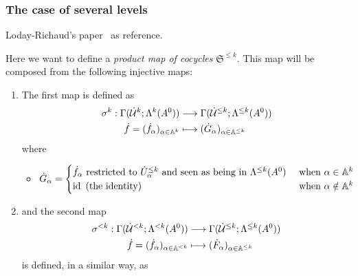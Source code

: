 \subsubsection{The case of several levels}
Loday-Richaud's paper~\cite{Loday1994} as reference.
\begin{defn}\label{defn:firstSetOfInlusions}
  Here we want to define a \emph{product map of cocycles}
  $\mathfrak{S}^{\leq k}$.
  This map will be composed from the following injective maps:
  \begin{enumerate}
    \item The first map is defined as
      \begin{align*}
        \sigma^k:\Gamma(\dot{\mathcal{U}}^k;\Lambda^k(A^0))
        &\longrightarrow \Gamma(\dot{\mathcal{U}}^{\leq k};\Lambda^{\leq k}(A^0))
      \\\dot f=(\dot f_\alpha)_{\alpha\in\mathbb{A}^k}
        &\longmapsto (\dot G_\alpha)_{\alpha\in\mathbb{A}^{\leq k}}
      \end{align*}
      where
      \begin{itemize}
        \item $\dot G_\alpha=\begin{cases}
            \dot f_\alpha \text{~restricted to } \dot U_\alpha^{\leq k}
            \text{~and seen as being in } \Lambda^{\leq k}(A^0)
            & \text{~when } \alpha\in\mathbb{A}^k
          \\\operatorname{id} \text{~(the identity) }
            & \text{~when } \alpha\notin\mathbb{A}^k
          \end{cases}$
      \end{itemize}
    \item and the second map
      \begin{align*}
        \sigma^{<k}:\Gamma(\dot{\mathcal{U}}^{<k};\Lambda^{<k}(A^0))
        &\longrightarrow \Gamma(\dot{\mathcal{U}}^{\leq k};\Lambda^{\leq k}(A^0))
      \\\dot f=(\dot f_\alpha)_{\alpha\in\mathbb{A}^{<k}}
        &\longmapsto (\dot F_\alpha)_{\alpha\in\mathbb{A}^{\leq k}}
      \end{align*}
      is defined, in a similar way, as
\end{enumerate}
\end{defn}
